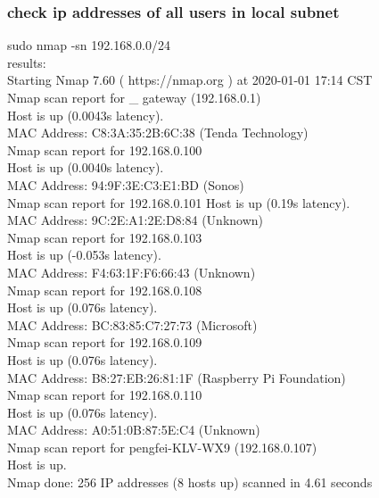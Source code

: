 \documentclass[UTF8,fancyhdr,a4paper]{ctexart}
\begin{document}
\subsubsection{check ip addresses of all users in local subnet}

sudo nmap -sn 192.168.0.0/24\\
results:\\
Starting Nmap 7.60 ( https://nmap.org ) at 2020-01-01 17:14 CST\\
Nmap scan report for \_ gateway (192.168.0.1)\\
Host is up (0.0043s latency).\\
MAC Address: C8:3A:35:2B:6C:38 (Tenda Technology)\\
Nmap scan report for 192.168.0.100\\
Host is up (0.0040s latency).\\
MAC Address: 94:9F:3E:C3:E1:BD (Sonos)\\
Nmap scan report for 192.168.0.101
Host is up (0.19s latency).\\
MAC Address: 9C:2E:A1:2E:D8:84 (Unknown)\\
Nmap scan report for 192.168.0.103\\
Host is up (-0.053s latency).\\
MAC Address: F4:63:1F:F6:66:43 (Unknown)\\
Nmap scan report for 192.168.0.108\\
Host is up (0.076s latency).\\
MAC Address: BC:83:85:C7:27:73 (Microsoft)\\
Nmap scan report for 192.168.0.109\\
Host is up (0.076s latency).\\
MAC Address: B8:27:EB:26:81:1F (Raspberry Pi Foundation)\\
Nmap scan report for 192.168.0.110\\
Host is up (0.076s latency).\\
MAC Address: A0:51:0B:87:5E:C4 (Unknown)\\
Nmap scan report for pengfei-KLV-WX9 (192.168.0.107)\\
Host is up.\\
Nmap done: 256 IP addresses (8 hosts up) scanned in 4.61 seconds\\
\end{document}
